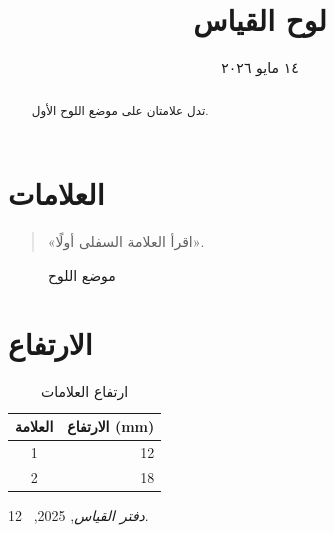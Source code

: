 \documentclass{article}
\begin{document}
\title{لوح القياس}\author{}\date{١٤ مايو ٢٠٢٦}\maketitle
\begin{abstract}تدل علامتان على موضع اللوح الأول.\end{abstract}
\tableofcontents
\section{العلامات}\begin{quote}«اقرأ العلامة السفلى أولًا».\end{quote}
\begin{figure}[ht]\centering\fbox{\rule{0pt}{8mm}\rule{33mm}{0pt}}\caption{موضع اللوح}\end{figure}
\section{الارتفاع}
\begin{table}[ht]\centering\begin{tabular}{cr}العلامة&الارتفاع (mm)\\\hline 1&12\\2&18\end{tabular}\caption{ارتفاع العلامات}\end{table}
\begin{thebibliography}{1}\emph{دفتر القياس}, 2025, \chaptername~2.\end{thebibliography}
\end{document}
